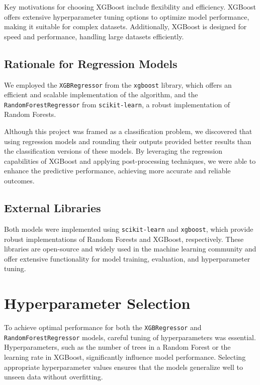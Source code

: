 \documentclass[12pt]{article}
\begin{document}
Key motivations for choosing XGBoost include flexibility and efficiency. XGBoost offers extensive hyperparameter tuning options to optimize model performance, making it suitable for complex datasets. Additionally, XGBoost is designed for speed and performance, handling large datasets efficiently.

\subsection{Rationale for Regression Models}

We employed the \texttt{XGBRegressor} from the \texttt{xgboost} library, which offers an efficient and scalable implementation of the algorithm, and the \texttt{RandomForestRegressor} from \texttt{scikit-learn}, a robust implementation of Random Forests.

Although this project was framed as a classification problem, we discovered that using regression models and rounding their outputs provided better results than the classification versions of these models. By leveraging the regression capabilities of XGBoost and applying post-processing techniques, we were able to enhance the predictive performance, achieving more accurate and reliable outcomes.

\subsection{External Libraries}

Both models were implemented using \texttt{scikit-learn} and \texttt{xgboost}, which provide robust implementations of Random Forests and XGBoost, respectively. These libraries are open-source and widely used in the machine learning community and offer extensive functionality for model training, evaluation, and hyperparameter tuning.

\section{Hyperparameter Selection}

To achieve optimal performance for both the \texttt{XGBRegressor} and \texttt{RandomForestRegressor} models, careful tuning of hyperparameters was essential. Hyperparameters, such as the number of trees in a Random Forest or the learning rate in XGBoost, significantly influence model performance. Selecting appropriate hyperparameter values ensures that the models generalize well to unseen data without overfitting.
\end{document}
